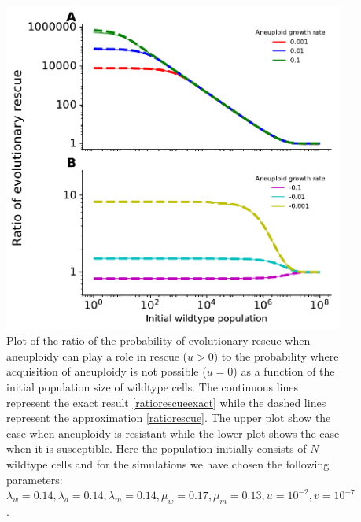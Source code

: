 \documentclass[12pt]{extarticle}
\begin{document}
\begin{figure}[!h]
 \vspace*{1\baselineskip}
\includegraphics[width=1\textwidth]{Figures/RatioEvolRescuePopulationSize.pdf}
\caption{Plot of the ratio of the probability of evolutionary rescue when aneuploidy can play a role in rescue ($u>0$) to the probability where acquisition of aneuploidy is not possible ($u=0$) as a function of the initial population size of wildtype cells. The continuous lines represent the exact result \eqref{ratiorescueexact} while the dashed lines represent the approximation \eqref{ratiorescue}. The upper plot show the case when aneuploidy is resistant while the lower plot shows the case when it is susceptible.  Here the population initially consists of $N$ wildtype cells and for the simulations we have chosen the following parameters: $\lambda_w=0.14, \lambda_a=0.14,\lambda_m=0.14,\mu_w=0.17,\mu_m=0.13, u=10^{-2}, v=10^{-7}$. }
\label{RatioEvolRescuePopulationSize}
\end{figure}
\end{document}
